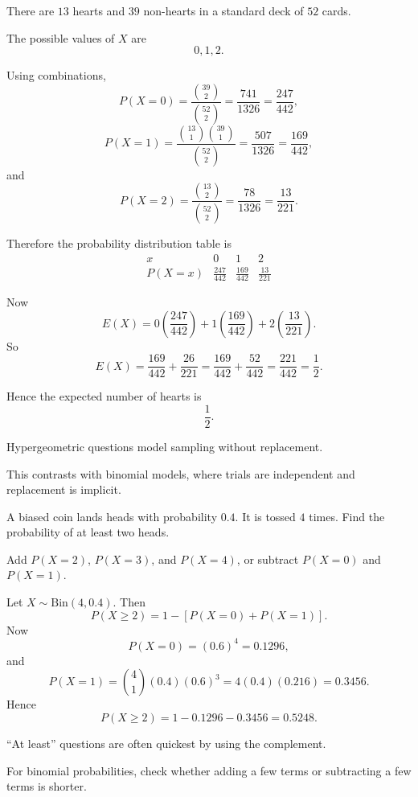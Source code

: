 \begin{solution}
There are $13$ hearts and $39$ non-hearts in a standard deck of $52$ cards.

The possible values of $X$ are
\[
0,1,2.
\]

Using combinations,
\[
P(X=0)=\frac{\binom{39}{2}}{\binom{52}{2}}=\frac{741}{1326}=\frac{247}{442},
\]
\[
P(X=1)=\frac{\binom{13}{1}\binom{39}{1}}{\binom{52}{2}}=\frac{507}{1326}=\frac{169}{442},
\]
and
\[
P(X=2)=\frac{\binom{13}{2}}{\binom{52}{2}}=\frac{78}{1326}=\frac{13}{221}.
\]

Therefore the probability distribution table is
\[
\begin{array}{c|ccc}
x & 0 & 1 & 2 \\
\hline
P(X=x) & \frac{247}{442} & \frac{169}{442} & \frac{13}{221}
\end{array}
\]

Now
\[
E(X)=0\left(\frac{247}{442}\right)+1\left(\frac{169}{442}\right)+2\left(\frac{13}{221}\right).
\]
So
\[
E(X)=\frac{169}{442}+\frac{26}{221}
=\frac{169}{442}+\frac{52}{442}
=\frac{221}{442}
=\frac12.
\]

Hence the expected number of hearts is
\[
\boxed{\frac12}.
\]
\end{solution}

\begin{takeaways}
\item Hypergeometric questions model sampling without replacement.
\item This contrasts with binomial models, where trials are independent and replacement is implicit.
\end{takeaways}

\begin{problem}
A biased coin lands heads with probability $0.4$. It is tossed $4$ times. Find the probability of at least two heads.
\end{problem}

\begin{hint}
Add $P(X=2)$, $P(X=3)$, and $P(X=4)$, or subtract $P(X=0)$ and $P(X=1)$.
\end{hint}

\begin{solution}
Let $X\sim \mathrm{Bin}(4,0.4)$. Then
\[
P(X\ge 2)=1-[P(X=0)+P(X=1)].
\]
Now
\[
P(X=0)=(0.6)^4=0.1296,
\]
and
\[
P(X=1)=\binom41(0.4)(0.6)^3=4(0.4)(0.216)=0.3456.
\]
Hence
\[
P(X\ge 2)=1-0.1296-0.3456=0.5248.
\]
\end{solution}

\begin{takeaways}
\item ``At least'' questions are often quickest by using the complement.
\item For binomial probabilities, check whether adding a few terms or subtracting a few terms is shorter.
\end{takeaways}

